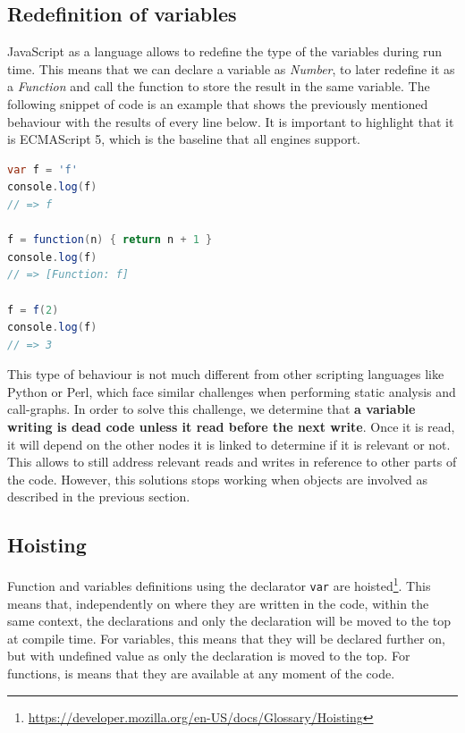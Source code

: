 \documentclass{uvamscse}
\begin{document}
\subsection{Redefinition of variables}
JavaScript as a language allows to redefine the type of the variables during run time. This means that we can declare a variable as \textit{Number}, to later redefine it as a \textit{Function} and call the function to store the result in the same variable. The following snippet of code is an example that shows the previously mentioned behaviour with the results of every line below. It is important to highlight that it is ECMAScript 5, which is the baseline that all engines support. 

\begin{lstlisting}[language=Java, caption=Example of variable redefinition in JavaScript.]
var f = 'f'
console.log(f)
// => f

f = function(n) { return n + 1 }
console.log(f)
// => [Function: f]

f = f(2)
console.log(f)
// => 3
\end{lstlisting}

This type of behaviour is not much different from other scripting languages like Python or Perl, which face similar challenges when performing static analysis and call-graphs. In order to solve this challenge, we determine that \textbf{a variable writing is dead code unless it read before the next write}. Once it is read, it will depend on the other nodes it is linked to determine if it is relevant or not. This allows to still address relevant reads and writes in reference to other parts of the code. However, this solutions stops working when objects are involved as described in the previous section.

\subsection{Hoisting}
Function and variables definitions using the declarator \texttt{var} are hoisted\footnote{\url{https://developer.mozilla.org/en-US/docs/Glossary/Hoisting}}. This means that, independently on where they are written in the code, within the same context, the declarations and only the declaration will be moved to the top at compile time. For variables, this means that they will be declared further on, but with undefined value as only the declaration is moved to the top. For functions, is means that they are available at any moment of the code.
\end{document}

